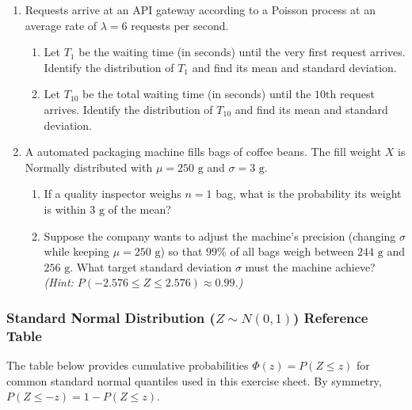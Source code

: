 \documentclass[
]{article}
\providecommand{\tightlist}{%
  \setlength{\itemsep}{0pt}\setlength{\parskip}{0pt}}
\begin{document}
\begin{enumerate}
\def\labelenumi{\arabic{enumi}.}
\tightlist
\item
  Requests arrive at an API gateway according to a Poisson process at an
  average rate of \(\lambda = 6\) requests per second.

  \begin{enumerate}
  \def\labelenumii{\alph{enumii})}
  \tightlist
  \item
    Let \(T_1\) be the waiting time (in seconds) until the very first
    request arrives. Identify the distribution of \(T_1\) and find its
    mean and standard deviation.
  \item
    Let \(T_{10}\) be the total waiting time (in seconds) until the
    \(10\text{th}\) request arrives. Identify the distribution of
    \(T_{10}\) and find its mean and standard deviation.
  \end{enumerate}
\item
  A automated packaging machine fills bags of coffee beans. The fill
  weight \(X\) is Normally distributed with \(\mu = 250\text{ g}\) and
  \(\sigma = 3\text{ g}\).

  \begin{enumerate}
  \def\labelenumii{\alph{enumii})}
  \tightlist
  \item
    If a quality inspector weighs \(n = 1\) bag, what is the probability
    its weight is within \(3\text{ g}\) of the mean?
  \item
    Suppose the company wants to adjust the machine's precision
    (changing \(\sigma\) while keeping \(\mu = 250\text{ g}\)) so that
    \(99\%\) of all bags weigh between \(244\text{ g}\) and
    \(256\text{ g}\). What target standard deviation \(\sigma\) must the
    machine achieve? \emph{(Hint:
    \(P(-2.576 \le Z \le 2.576) \approx 0.99\).)}
  \end{enumerate}
\end{enumerate}

\subsubsection{\texorpdfstring{Standard Normal Distribution
(\(Z \sim N(0, 1)\)) Reference
Table}{Standard Normal Distribution (Z \textbackslash sim N(0, 1)) Reference Table}}\label{standard-normal-distribution-z-sim-n0-1-reference-table}

The table below provides cumulative probabilities
\(\Phi(z) = P(Z \le z)\) for common standard normal quantiles used in
this exercise sheet. By symmetry, \(P(Z \le -z) = 1 - P(Z \le z)\).
\end{document}
